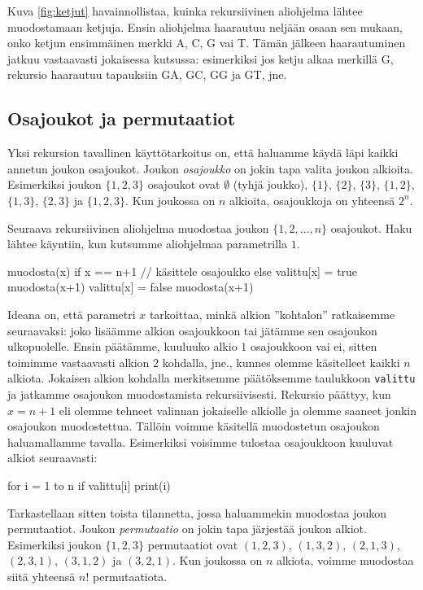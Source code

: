 Kuva \ref{fig:ketjut} havainnollistaa,
kuinka rekursiivinen aliohjelma lähtee muodostamaan ketjuja.
Ensin aliohjelma haarautuu neljään osaan sen mukaan,
onko ketjun ensimmäinen merkki A, C, G vai T.
Tämän jälkeen haarautuminen jatkuu vastaavasti
jokaisessa kutsussa:
esimerkiksi jos ketju alkaa merkillä G,
rekursio haarautuu tapauksiin GA, GC, GG ja GT, jne.

\subsection{Osajoukot ja permutaatiot}

Yksi rekursion tavallinen käyttötarkoitus on,
että haluamme käydä läpi kaikki annetun joukon
osajoukot.
Joukon \emph{osajoukko} on jokin tapa valita joukon alkioita.
Esimerkiksi joukon $\{1,2,3\}$ osajoukot ovat
$\emptyset$ (tyhjä joukko), $\{1\}$, $\{2\}$, $\{3\}$,
$\{1,2\}$, $\{1,3\}$, $\{2,3\}$ ja $\{1,2,3\}$.
Kun joukossa on $n$ alkioita, osa\-joukkoja on yhteensä $2^n$.

Seuraava rekursiivinen aliohjelma muodostaa joukon
$\{1,2,\dots,n\}$ osajoukot.
Haku lähtee käyntiin, kun kutsumme aliohjelmaa
parametrilla $1$.

\begin{code}
muodosta(x)
    if x == n+1
        // käsittele osajoukko
    else
        valittu[x] = true
        muodosta(x+1)
        valittu[x] = false
        muodosta(x+1)
\end{code}

Ideana on, että parametri $x$ tarkoittaa, minkä alkion
''kohtalon'' ratkaisemme seuraavaksi: joko lisäämme alkion
osajoukkoon tai jätämme sen osa\-joukon ulkopuolelle.
Ensin päätämme, kuuluuko alkio $1$ osajoukkoon vai ei,
sitten toimimme vastaavasti alkion $2$ kohdalla, jne.,
kunnes olemme käsitelleet kaikki $n$ alkiota.
Jokaisen alkion kohdalla merkitsemme päätöksemme taulukkoon
\texttt{valittu} ja jatkamme osajoukon muodostamista rekursiivisesti.
Rekursio päät\-tyy, kun $x=n+1$ eli olemme tehneet valinnan
jokaiselle alkiolle ja olemme saaneet jonkin osajoukon muodostettua.
Tällöin voimme käsitellä muodostetun osajoukon haluamallamme tavalla.
Esimerkiksi voisimme tulostaa osajoukkoon kuuluvat alkiot seuraavasti:

\begin{code}
for i = 1 to n
    if valittu[i]
        print(i)
\end{code}

Tarkastellaan sitten toista tilannetta, jossa haluammekin
muodostaa joukon permutaatiot.
Joukon \emph{permutaatio} on jokin tapa järjestää joukon alkiot.
Esimerkiksi joukon $\{1,2,3\}$ permutaatiot ovat
$(1,2,3)$, $(1,3,2)$, $(2,1,3)$, $(2,3,1)$, $(3,1,2)$ ja $(3,2,1)$.
Kun joukossa on $n$ alkiota, voimme muodostaa siitä yhteensä $n!$ permutaatiota.

